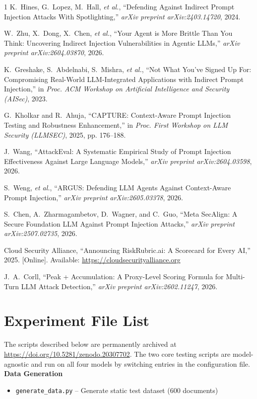 \documentclass[journal]{IEEEtran}
\begin{document}
\begin{thebibliography}{1}
K.~Hines, G.~Lopez, M.~Hall, \emph{et al.}, ``Defending Against Indirect Prompt Injection Attacks With Spotlighting,'' \emph{arXiv preprint arXiv:2403.14720}, 2024.

W.~Zhu, X.~Dong, X.~Chen, \emph{et al.}, ``Your Agent is More Brittle Than You Think: Uncovering Indirect Injection Vulnerabilities in Agentic LLMs,'' \emph{arXiv preprint arXiv:2604.03870}, 2026.

K.~Greshake, S.~Abdelnabi, S.~Mishra, \emph{et al.}, ``Not What You've Signed Up For: Compromising Real-World LLM-Integrated Applications with Indirect Prompt Injection,'' in \emph{Proc. ACM Workshop on Artificial Intelligence and Security (AISec)}, 2023.

G.~Kholkar and R.~Ahuja, ``CAPTURE: Context-Aware Prompt Injection Testing and Robustness Enhancement,'' in \emph{Proc. First Workshop on LLM Security (LLMSEC)}, 2025, pp. 176--188.

J.~Wang, ``AttackEval: A Systematic Empirical Study of Prompt Injection Effectiveness Against Large Language Models,'' \emph{arXiv preprint arXiv:2604.03598}, 2026.

S.~Weng, \emph{et al.}, ``ARGUS: Defending LLM Agents Against Context-Aware Prompt Injection,'' \emph{arXiv preprint arXiv:2605.03378}, 2026.

S.~Chen, A.~Zharmagambetov, D.~Wagner, and C.~Guo, ``Meta SecAlign: A Secure Foundation LLM Against Prompt Injection Attacks,'' \emph{arXiv preprint arXiv:2507.02735}, 2026.

Cloud Security Alliance, ``Announcing RiskRubric.ai: A Scorecard for Every AI,'' 2025. [Online]. Available: \url{https://cloudsecurityalliance.org}

J.~A.~Corll, ``Peak + Accumulation: A Proxy-Level Scoring Formula for Multi-Turn LLM Attack Detection,'' \emph{arXiv preprint arXiv:2602.11247}, 2026.
\end{thebibliography}

\appendices
\section{Experiment File List}
The scripts described below are permanently archived at 
\url{https://doi.org/10.5281/zenodo.20307702}. 
The two core testing scripts are model-agnostic and run on all four 
models by switching entries in the configuration file.
\vspace{4pt}
\noindent\textbf{Data Generation}
\begin{itemize}
    \setlength{\itemsep}{0pt}
    \item \texttt{generate\_data.py} -- Generate static test dataset (600 documents)
\end{itemize}
\end{document}
